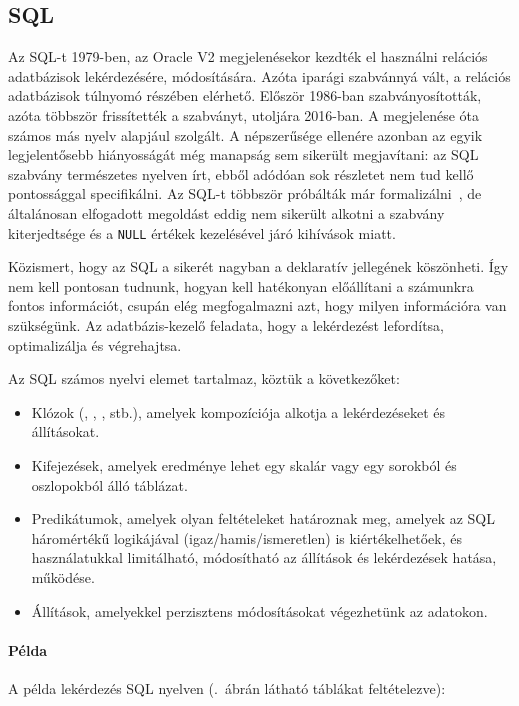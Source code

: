 \subsection{SQL}
Az SQL-t 1979-ben, az Oracle V2 megjelenésekor kezdték el használni relációs adatbázisok lekérdezésére, módosítására. Azóta iparági szabvánnyá vált, a relációs adatbázisok túlnyomó részében elérhető. Először 1986-ban szabványosították, azóta többször frissítették a szabványt, utoljára 2016-ban. A megjelenése óta számos más nyelv alapjául szolgált. A népszerűsége ellenére azonban az egyik legjelentősebb hiányosságát még manapság sem sikerült megjavítani: az SQL szabvány természetes nyelven írt, ebből adódóan sok részletet nem tud kellő pontossággal specifikálni. Az SQL-t többször próbálták már formalizálni~\cite{DBLP:journals/pvldb/GuagliardoL17}, de általánosan elfogadott megoldást eddig nem sikerült alkotni a szabvány kiterjedtsége és a \texttt{NULL} értékek kezelésével járó kihívások miatt.

Közismert, hogy az SQL a sikerét nagyban a deklaratív jellegének köszönheti. Így nem kell pontosan tudnunk, hogyan kell hatékonyan előállítani a számunkra fontos információt, csupán elég megfogalmazni azt, hogy milyen információra van szükségünk. Az adatbázis-kezelő feladata, hogy a lekérdezést lefordítsa, optimalizálja és végrehajtsa.

Az SQL számos nyelvi elemet tartalmaz, köztük a következőket:
\begin{itemize}
	\item Klózok (, , ,  stb.), amelyek kompozíciója alkotja a lekérdezéseket és állításokat.
	\item Kifejezések, amelyek eredménye lehet egy skalár vagy egy sorokból és oszlopokból álló táblázat.
	\item Predikátumok, amelyek olyan feltételeket határoznak meg, amelyek az SQL háromértékű logikájával (igaz/hamis/ismeretlen) is kiértékelhetőek, és használatukkal limitálható, módosítható az állítások és lekérdezések hatása, működése.
	\item Állítások, amelyekkel perzisztens módosításokat végezhetünk az adatokon.
\end{itemize}

\paragraph{Példa}

A példa lekérdezés SQL nyelven (.~ábrán látható táblákat feltételezve):

